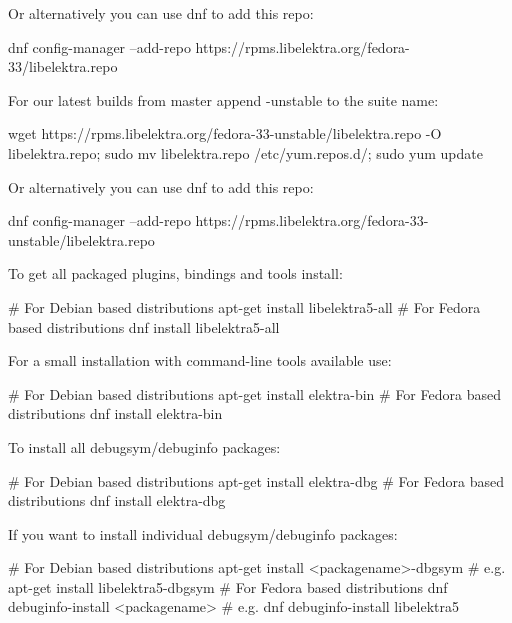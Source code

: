 Or alternatively you can use dnf to add this repo\+:


\begin{DoxyCode}
dnf config-manager --add-repo https://rpms.libelektra.org/fedora-33/libelektra.repo
\end{DoxyCode}


For our latest builds from master append {\ttfamily -\/unstable} to the suite name\+:


\begin{DoxyCode}
wget https://rpms.libelektra.org/fedora-33-unstable/libelektra.repo -O libelektra.repo;
sudo mv libelektra.repo /etc/yum.repos.d/;
sudo yum update
\end{DoxyCode}


Or alternatively you can use dnf to add this repo\+:


\begin{DoxyCode}
dnf config-manager --add-repo https://rpms.libelektra.org/fedora-33-unstable/libelektra.repo
\end{DoxyCode}


To get all packaged plugins, bindings and tools install\+:


\begin{DoxyCode}
# For Debian based distributions
apt-get install libelektra5-all
# For Fedora based distributions
dnf install libelektra5-all
\end{DoxyCode}


For a small installation with command-\/line tools available use\+:


\begin{DoxyCode}
# For Debian based distributions
apt-get install elektra-bin
# For Fedora based distributions
dnf install elektra-bin
\end{DoxyCode}


To install all debugsym/debuginfo packages\+:


\begin{DoxyCode}
# For Debian based distributions
apt-get install elektra-dbg
# For Fedora based distributions
dnf install elektra-dbg
\end{DoxyCode}


If you want to install individual debugsym/debuginfo packages\+:


\begin{DoxyCode}
# For Debian based distributions
apt-get install <packagename>-dbgsym # e.g. apt-get install libelektra5-dbgsym
# For Fedora based distributions
dnf debuginfo-install <packagename> # e.g. dnf debuginfo-install libelektra5
\end{DoxyCode}


